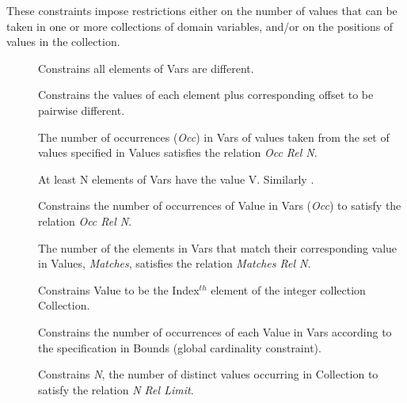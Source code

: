 These constraints impose restrictions either on the number of
 values that can be taken in one or more collections of domain
 variables, and/or on the positions of values in the collection.
\begin{description}
\item[]
Constrains all elements of Vars are different.

\item[]
Constrains the values of each element plus corresponding offset to be pairwise different.

\item[]
The number of occurrences ({\em Occ}) in Vars of values taken from the set of
values specified in Values satisfies the relation {\em Occ Rel N}.

\item[]
At least N elements of Vars have the value V. Similarly 
.

\item[]
Constrains the number of occurrences of Value in Vars ({\em Occ}) to satisfy
the relation {\em Occ Rel N}.

\item[]
The number of the elements in Vars that
 match their corresponding value in Values, {\em Matches}, satisfies the
 relation {\em Matches Rel N}.

\item[]
Constrains Value to be the Index$^{th}$ element of the integer collection Collection.
 
\item[]
Constrains the number of occurrences of each Value in Vars according to the specification
in Bounds (global cardinality constraint).

\item[]
Constrains {\em N}, the number of distinct values occurring in 
Collection to satisfy the relation {\em N Rel Limit}.


\end{description}
